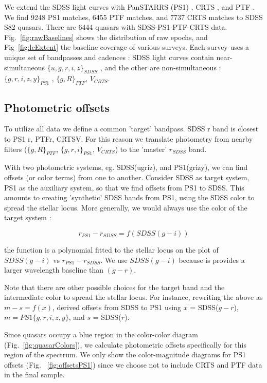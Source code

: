 \documentclass[twocolumn]{aastex62}
\begin{document}
We extend the SDSS  light curves with PanSTARRS (PS1) \citep{chambers2011,flewelling2018}, CRTS \citep{drake2009}, and PTF \citep{rau2009}. We find 9248 PS1 matches, 6455 PTF matches, and 7737 CRTS matches to SDSS S82 quasars. There are  6444 quasars with SDSS-PS1-PTF-CRTS data.  Fig.~\ref{fig:rawBaselines}  shows the distribution of raw epochs, and Fig~\ref{fig:lcExtent} the  baseline coverage of various surveys.    Each survey uses a unique set of bandpasses and cadences : SDSS light curves contain near-simultaneous $\{u,g,r,i,z\}_{SDSS}$ , and the other are  non-simultaneous : $\{g,r,i,z,y\}_{PS1}$ ,  $\{g,R\}_{PTF}$, $V_{CRTS}$.  

\subsection{Photometric offsets}

To utilize all data we define a common 'target' bandpass. SDSS r band is closest to PS1 r, PTFr, CRTSV. For this reason we translate photometry from nearby filters ($\{g,R\}_{PTF}$, $\{g,r,i\}_{PS1}$, $V_{CRTS}$) to the  'master' $r_{SDSS}$  band.

With two photometric systems, eg. SDSS(ugriz), and PS1(grizy),  we can find offsets (or color terms) from one to another. Consider SDSS as target system,  PS1 as the auxiliary system, so that we find offsets from PS1 to SDSS. This amounts to creating 'synthetic' SDSS bands from PS1, using the SDSS color to spread the stellar locus. More generally, we would always use the color of the target system : 

\begin{equation}
r_{PS1} -  r_{SDSS} = f ( SDSS (g-i ))
\end{equation}

the function is a polynomial fitted to the stellar locus on the plot of $SDSS (g-i )$ vs $r_{PS1} -  r_{SDSS} $. We use $SDSS(g-i)$ because is provides a larger wavelength baseline than $(g-r)$. 

Note that there are other possible choices for the target band and the intermediate color to spread the stellar locus. For instance, rewriting the above as  $m - s = f(x)$, \cite{tonry2012} derived offsets from SDSS to PS1  using $x$ = SDSS($g-r$), $m = PS1 \{g,r,i,z,y\}$, and $s$ = SDSS($r$).

Since quasars occupy a blue region in the color-color diagram (Fig.~\ref{fig:quasarColors}), we calculate photometric offsets specifically for this region of the spectrum.  We only show the color-magnitude diagrams  for PS1 offsets  (Fig. ~\ref{fig:offsetsPS1}) since we choose not to include CRTS and PTF data in the final sample.
\end{document}

